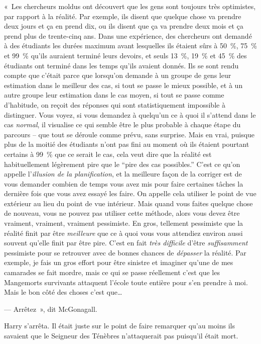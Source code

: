 «~Les chercheurs moldus ont découvert que les gens sont toujours très optimistes, par rapport à la réalité.
Par exemple, ils disent que quelque chose va prendre deux jours et ça en prend dix, ou ils disent que ça va prendre deux mois et ça prend plus de trente-cinq ans.
Dans une expérience, des chercheurs ont demandé à des étudiants les durées maximum avant lesquelles ils étaient sûrs à 50~\%, 75~\% et 99~\% qu'ils auraient terminé leurs devoirs, et seuls 13~\%, 19~\% et 45~\% des étudiants ont terminé dans les temps qu'ils avaient donnés.
Ils se sont rendu compte que c'était parce que lorsqu'on demande à un groupe de gens leur estimation dans le meilleur des cas, si tout se passe le mieux possible, et à un autre groupe leur estimation dans le cas moyen, si tout se passe comme d'habitude, on reçoit des réponses qui sont statistiquement impossible à distinguer.
Vous voyez, si vous demandez à quelqu'un ce à quoi il s'attend dans le cas \emph{normal}, il visualise ce qui semble être le plus probable à chaque étape du parcours -- que tout se déroule comme prévu, sans surprise.
Mais en vrai, puisque plus de la moitié des étudiants n'ont pas fini au moment où ils étaient pourtant certains à 99~\% que ce serait le cas, cela veut dire que la réalité est habituellement légèrement pire que le “pire des cas possibles.”
C'est ce qu'on appelle l'\emph{illusion de la planification}, et la meilleure façon de la corriger est de vous demander combien de temps vous avez mis pour faire certaines tâches la dernière fois que vous avez essayé les faire.
On appelle cela utiliser le point de vue extérieur au lieu du point de vue intérieur.
Mais quand vous faites quelque chose de nouveau, vous ne pouvez pas utiliser cette méthode, alors vous devez être vraiment, vraiment, vraiment pessimiste.
En gros, tellement pessimiste que la réalité finit par être \emph{meilleure} que ce à quoi vous vous attendiez environ aussi souvent qu'elle finit par être pire.
C'est en fait \emph{très difficile} d'être \emph{suffisamment} pessimiste pour se retrouver avec de bonnes chances de \emph{dépasser} la réalité.
Par exemple, je fais un gros effort pour être sinistre et imaginer qu'une de mes camarades se fait mordre, mais ce qui se passe réellement c'est que les Mangemorts survivants attaquent l'école toute entière pour s'en prendre à moi. Mais le bon côté des choses c'est que…

--- Arrêtez~», dit McGonagall.

Harry s'arrêta. Il était juste sur le point de faire remarquer qu'au moins ils savaient que le Seigneur des Ténèbres n'attaquerait pas puisqu'il était mort.

